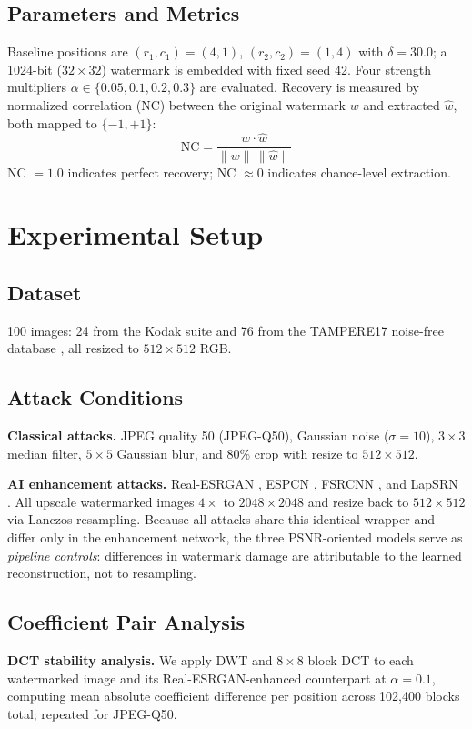 \documentclass[conference]{IEEEtran}
\begin{document}
\subsection{Parameters and Metrics}
Baseline positions are $(r_1,c_1)=(4,1)$, $(r_2,c_2)=(1,4)$ with
$\delta=30.0$; a 1024-bit ($32\times32$) watermark is embedded with
fixed seed 42.
Four strength multipliers $\alpha \in \{0.05, 0.1, 0.2, 0.3\}$ are
evaluated. Recovery is measured by normalized correlation (NC) between
the original watermark $w$ and extracted $\hat{w}$, both mapped to
$\{-1,+1\}$:
\begin{equation}
\mathrm{NC} = \frac{w \cdot \hat{w}}{\lVert w \rVert\, \lVert \hat{w} \rVert}
\end{equation}
NC $= 1.0$ indicates perfect recovery; NC $\approx 0$ indicates
chance-level extraction.

\section{Experimental Setup}
\label{sec:setup}

\subsection{Dataset}
100 images: 24 from the Kodak suite \cite{kodak} and 76 from the
TAMPERE17 noise-free database \cite{tampere17}, all resized to
$512\times512$ RGB.

\subsection{Attack Conditions}
\textbf{Classical attacks.} JPEG quality 50 (JPEG-Q50), Gaussian noise
($\sigma=10$), $3\times3$ median filter, $5\times5$ Gaussian blur, and
80\% crop with resize to $512\times512$.

\textbf{AI enhancement attacks.} Real-ESRGAN \cite{realesrgan2021},
ESPCN \cite{espcn2016}, FSRCNN \cite{fsrcnn2016}, and LapSRN
\cite{lapsrn2017}. All upscale watermarked images $4\times$ to
$2048\times2048$ and resize back to $512\times512$ via Lanczos
resampling. Because all attacks share this identical wrapper and differ
only in the enhancement network, the three PSNR-oriented models serve as
\emph{pipeline controls}: differences in watermark damage are
attributable to the learned reconstruction, not to resampling.

\subsection{Coefficient Pair Analysis}
\textbf{DCT stability analysis.} We apply DWT and $8\times8$ block DCT
to each watermarked image and its Real-ESRGAN-enhanced counterpart at
$\alpha=0.1$, computing mean absolute coefficient difference per position
across 102,400 blocks total; repeated for JPEG-Q50.
\end{document}
